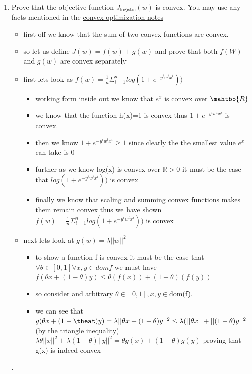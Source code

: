 \documentclass{article}
\theoremstyle{plain}
\theoremstyle{definition}
\begin{document}
\begin{enumerate}
  \setcounter{enumi}{\value{saveenum}}
\item Prove that the objective function $J_{\text{logistic}}(w)$ is convex.
You may use any facts mentioned in the \href{https://davidrosenberg.github.io/mlcourse/Notes/convex-optimization.pdf}{convex optimization notes}
\begin{itemize}
    \color{blue}
    \item first off we know that the sum of two convex functions are convex. 
    \item so let us define $J(w)=f(w)+g(w)$ and prove that both $f(W)$ and $g(w)$ are convex separately
    \item first lets look as $f(w)=\frac{1}{n}\Sigma_{i=1}^{n}log(1+e^{-y^iw^tx^i}))$
    \begin{itemize}
        \item working form inside out we know that $e^x$ is convex over $\mahtbb{R}$
        \item we know that the function h(x)=1 is convex thus $1+e^{-y^iw^tx^i}$ is convex. 
        \item then we know $1+e^{-y^iw^tx^i}\geq 1$ since clearly the the smallest value $e^{x}$ can take is 0 
        \item further as we know log(x) is convex over $\mathbb{R}>0$ it must be the case that $log(1+e^{-y^iw^tx^i}))$ is convex
        \item finally we know that scaling and summing convex functions makes them remain convex thus we have shown $f(w)=\frac{1}{n}\Sigma_{i=1}^{n}log(1+e^{-y^iw^tx^i}))$ is convex
    \end{itemize}
    \item next lets look at $g(w)=\lambda||w||^2$
    \begin{itemize}
        \item to show a function f is convex it must be the case that $\forall \theta\in [0,1] \forall x,y\in dom f$ we must have $f(\theta x +(1-\theta)y)\leq \theta(f(x))+(1-\theta)(f(y))$
        \item so consider and arbitrary $\theta \in [0,1] ,x,y\in $dom(f). 
        \item we can see that $g(\theta x + (1-\theat) y)=\lambda||\theta x+ (1-\theta)y||^2\leq \lambda (||\theta x||+ ||(1-\theta)y||^2 $ (by the triangle inequality) = $\lambda \theta ||x||^2+ \lambda (1-\theta)||y||^2=\theta g(x)+(1-\theta)g(y)$ proving that g(x) is indeed convex
    \end{itemize}
\end{itemize}
.


\end{enumerate}
\end{document}
